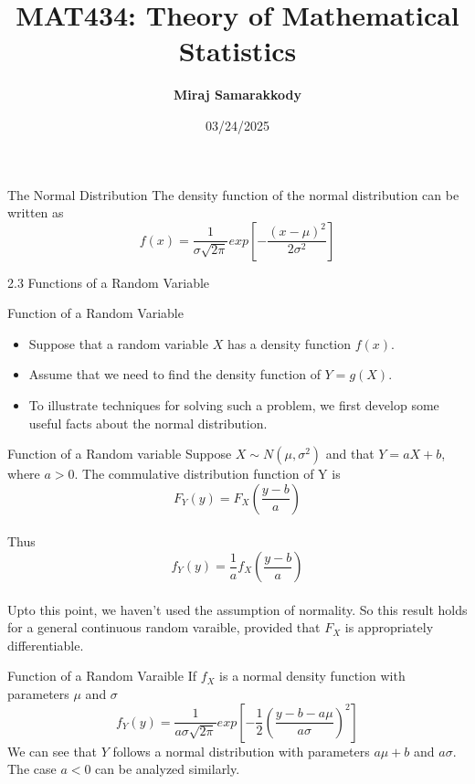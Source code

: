 \documentclass{beamer}
\title{MAT434: Theory of Mathematical Statistics}
\author{\textbf{Miraj Samarakkody}}
\institute{Tougaloo College}
\date{03/24/2025}
\begin{document}
\begin{frame}
    \titlepage
\end{frame}

\begin{frame}{The Normal Distribution}
The density function of the normal distribution can be written as \[f(x)= \dfrac{1}{\sigma \sqrt{2 \pi}}exp\left[-\dfrac{(x-\mu)^2}{2\sigma^2}\right]\]
\end{frame}

\begin{frame}{}
    \begin{center}
        \Huge{2.3 Functions of a Random Variable}
    \end{center}

\end{frame}

\begin{frame}{Function of a Random Variable}
\begin{itemize}
    \item Suppose that a random variable \(X\) has a density function \(f(x)\). \pause
    \item Assume that we need to find the density function of \(Y=g(X)\). \pause
    \item To illustrate techniques for solving such a problem, we first develop some useful facts about the normal distribution. 
\end{itemize}
\end{frame}

\begin{frame}{Function of a Random variable}
Suppose \(X \sim N(\mu, \sigma^2) \) and that \(Y=aX+b\), where \(a>0\). The commulative distribution function of Y is \[F_Y(y)=F_X\left(\dfrac{y-b }{a}\right)\] \pause\\
 Thus \[f_Y (y)=\dfrac{1}{a}f_X \left(\dfrac{y-b}{a}\right)\] \pause\\
 Upto this point, we haven't used the assumption of normality. So this result holds for a general continuous random varaible, provided that \(F_X\) is appropriately differentiable. 
\end{frame}

\begin{frame}{Function of a Random Varaible}
If \(f_X\) is a normal density function with parameters \(\mu\) and \(\sigma\) \[f_Y (y) = \dfrac{1}{a \sigma \sqrt{2 \pi}}exp\left[-\dfrac{1}{2}\left(\dfrac{y-b-a \mu}{a\sigma}\right)^2\right]\]\pause
We can see that \(Y\) follows a normal distribution with parameters \(a \mu +b\) and \(a \sigma\). \\ \pause
The case \(a<0\) can be analyzed similarly.   
\end{frame}
\end{document}
